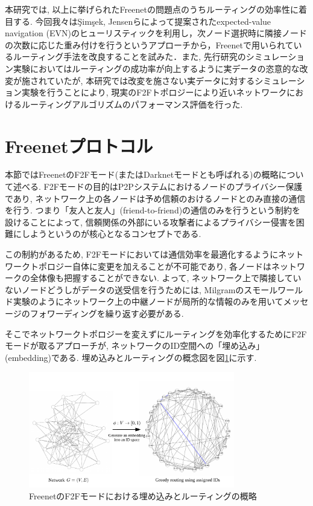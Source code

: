 \documentclass[technicalreport]{./ieicej-v3.0/UTF/ieicej}
\begin{document}
本研究では, 以上に挙げられたFreenetの問題点のうちルーティングの効率性に着目する. 今回我々は{\c{S}}im{\c{s}}ek, Jensenらによって提案されたexpected-value navigation (EVN)\cite{simsek2008navigating}のヒューリスティックを利用し，次ノード選択時に隣接ノードの次数に応じた重み付けを行うというアプローチから，Freenetで用いられているルーティング手法を改良することを試みた．また, 先行研究のシミュレーション実験においてはルーティングの成功率が向上するように実データの恣意的な改変が施されていたが, 本研究では改変を施さない実データに対するシミュレーション実験を行うことにより, 現実のF2Fトポロジーにより近いネットワークにおけるルーティングアルゴリズムのパフォーマンス評価を行った.


 \section{Freenetプロトコル} \label{sec:freenetprotocols}
  本節ではFreenetのF2Fモード(またはDarknetモードとも呼ばれる)の概略について述べる. F2Fモードの目的はP2Pシステムにおけるノードのプライバシー保護であり, ネットワーク上の各ノードは予め信頼のおけるノードとのみ直接の通信を行う. つまり「友人と友人」(friend-to-friend)の通信のみを行うという制約を設けることによって, 信頼関係の外部にいる攻撃者によるプライバシー侵害を困難にしようというのが核心となるコンセプトである.

   この制約があるため, F2Fモードにおいては通信効率を最適化するようにネットワークトポロジー自体に変更を加えることが不可能であり, 各ノードはネットワークの全体像も把握することができない. よって, ネットワーク上で隣接していないノードどうしがデータの送受信を行うためには, Milgramのスモールワールド実験\cite{milgram67smallworld}のようにネットワーク上の中継ノードが局所的な情報のみを用いてメッセージのフォワーディングを繰り返す必要がある. 

   そこでネットワークトポロジーを変えずにルーティングを効率化するためにF2Fモードが取るアプローチが, ネットワークのID空間への「埋め込み」(embedding)である. 埋め込みとルーティングの概念図を図\ref{fig:f2f_overview}に示す.

   \begin{figure}[htb]
    \centerline{\includegraphics[width=90mm]{../fig/greedy_embedding_overview.pdf}}
    \caption{FreenetのF2Fモードにおける埋め込みとルーティングの概略}
    \label{fig:f2f_overview}
   \end{figure}
\end{document}
